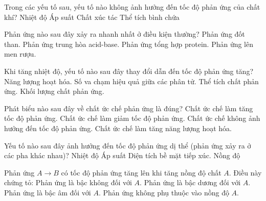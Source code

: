 \documentclass[Main.tex]{subfiles}
\begin{document}
\begin{ex}
	Trong các yếu tố sau, yếu tố nào không ảnh hưởng đến tốc độ phản ứng của chất khí?
	\choice
	{Nhiệt độ}
	{Áp suất}
	{Chất xúc tác}
	{\True Thể tích bình chứa}
\end{ex}

\begin{ex}
	Phản ứng nào sau đây xảy ra nhanh nhất ở điều kiện thường?
	\choice
	{Phản ứng đốt than.}
	{\True Phản ứng trung hòa acid-base.}
	{Phản ứng tổng hợp protein.}
	{Phản ứng lên men rượu.}
\end{ex}

\begin{ex}
	Khi tăng nhiệt độ, yếu tố nào sau đây thay đổi dẫn đến tốc độ phản ứng tăng?
	\choice
	{Năng lượng hoạt hóa.}
	{\True Số va chạm hiệu quả giữa các phân tử.}
	{Thể tích chất phản ứng.}
	{Khối lượng chất phản ứng.}
\end{ex}

\begin{ex}
	Phát biểu nào sau đây về chất ức chế phản ứng là đúng?
	\choice
	{Chất ức chế làm tăng tốc độ phản ứng.}
	{\True Chất ức chế làm giảm tốc độ phản ứng.}
	{Chất ức chế không ảnh hưởng đến tốc độ phản ứng.}
	{Chất ức chế làm tăng năng lượng hoạt hóa.}
\end{ex}

\begin{ex}
	Yếu tố nào sau đây ảnh hưởng đến tốc độ phản ứng dị thể (phản ứng xảy ra ở các pha khác nhau)?
	\choice
	{Nhiệt độ}
	{Áp suất}
	{\True Diện tích bề mặt tiếp xúc.}
	{Nồng độ}
\end{ex}

\begin{ex}
	Phản ứng $A \rightarrow B$ có tốc độ phản ứng tăng lên khi tăng nồng độ chất $A$. Điều này chứng tỏ:
	\choice
	{Phản ứng là bậc không đối với $A$.}
	{\True Phản ứng là bậc dương đối với $A$.}
	{Phản ứng là bậc âm đối với $A$.}
	{Phản ứng không phụ thuộc vào nồng độ $A$.}
\end{ex}
\end{document}
